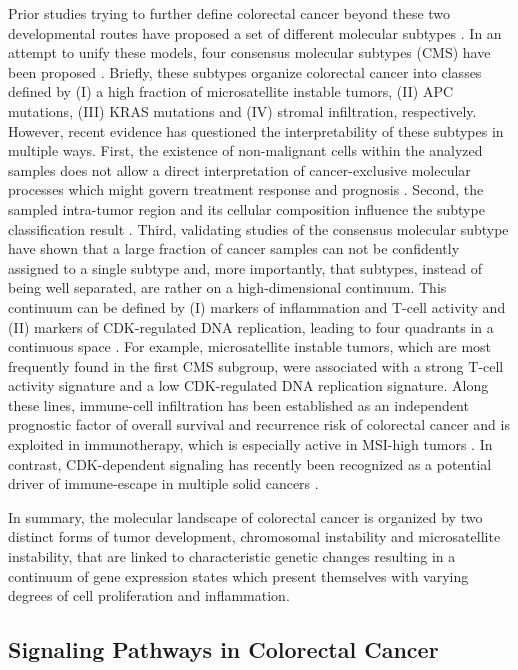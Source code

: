 \begin{flushleft}
Prior studies trying to further define colorectal cancer beyond these two developmental routes have proposed a set of different molecular subtypes \cite{Menter}. In an attempt to unify these models, four consensus molecular subtypes (CMS) have been proposed \cite{Guinney2015TheCancer.}. Briefly, these subtypes organize colorectal cancer into classes defined by (I) a high fraction of microsatellite instable tumors, (II) APC mutations, (III) KRAS mutations and (IV) stromal infiltration, respectively. However, recent evidence has questioned the interpretability of these subtypes in multiple ways. First, the existence of non-malignant cells within the analyzed samples does not allow a direct interpretation of cancer-exclusive molecular processes which might govern treatment response and prognosis \cite{Dunne}. Second, the sampled intra-tumor region and its cellular composition influence the subtype classification result \cite{Dunne2016ChallengingCancer.}. Third, validating studies of the consensus molecular subtype have shown that a large fraction of cancer samples can not be confidently assigned to a single subtype and, more importantly, that subtypes, instead of being well separated, are rather on a high-dimensional continuum. This continuum can be defined by (I) markers of inflammation and T-cell activity and (II) markers of CDK-regulated DNA replication, leading to four quadrants in a continuous space \cite{Ma}. For example, microsatellite instable tumors, which are most frequently found in the first CMS subgroup, were associated with a strong T-cell activity signature and a low CDK-regulated DNA replication signature. Along these lines, immune-cell infiltration has been established as an independent prognostic factor of overall survival and recurrence risk of colorectal cancer and is exploited in immunotherapy, which is especially active in MSI-high tumors \cite{galon, pages}. In contrast, CDK-dependent signaling has recently been recognized as a potential driver of immune-escape in multiple solid cancers \cite{Chaikovsky1}. \par 

In summary, the molecular landscape of colorectal cancer is organized by two distinct forms of tumor development, chromosomal instability and microsatellite instability, that are linked to characteristic genetic changes resulting in a continuum of gene expression states which present themselves with varying degrees of cell proliferation and inflammation. \par

\subsection{Signaling Pathways in Colorectal Cancer}

\end{flushleft}

